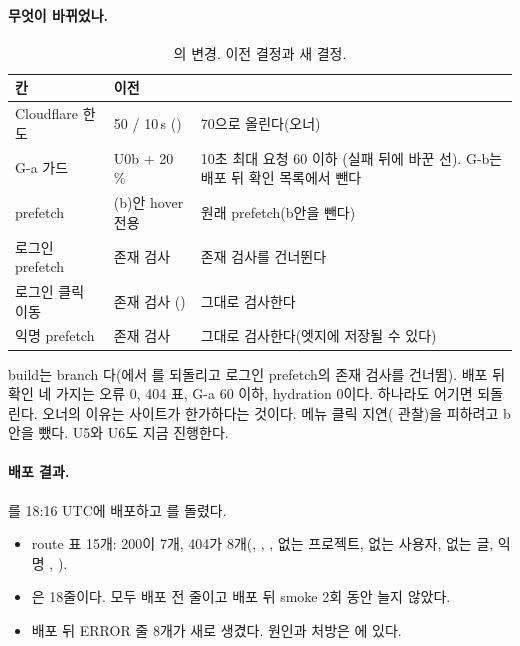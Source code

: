 \paragraph{무엇이 바뀌었나.}
\begin{table}[H]
  \caption{의 변경. 이전 결정과 새 결정.}
  \label{tab:re-u4-o}
  \centering\small
  \begin{tabularx}{\linewidth}{@{}L{3.0cm} L{3.4cm} Y@{}}
    \toprule
    칸 & 이전 &  \\
    \midrule
    Cloudflare 한도 & 50 / 10\,s () & 70으로 올린다(오너) \\
    \midrule
    G-a 가드 & U0b + 20\,\% & 10초 최대 요청 60 이하 (실패 뒤에 바꾼 선). G-b는 배포 뒤 확인 목록에서 뺀다 \\
    \midrule
    prefetch & (b)안 hover 전용 & 원래 prefetch(b안을 뺀다) \\
    \midrule
    로그인 prefetch & 존재 검사 & 존재 검사를 건너뛴다 \\
    \midrule
    로그인 클릭 이동 & 존재 검사 () & 그대로 검사한다 \\
    \midrule
    익명 prefetch & 존재 검사 & 그대로 검사한다(엣지에 저장될 수 있다) \\
    \bottomrule
  \end{tabularx}
\end{table}
build는 branch 다(에서 를 되돌리고 로그인 prefetch의 존재 검사를 건너뜀).
배포 뒤 확인 네 가지는 오류 0, 404 표, G-a 60 이하, hydration 0이다. 하나라도 어기면 되돌린다.
오너의 이유는 사이트가 한가하다는 것이다. 메뉴 클릭 지연( 관찰)을 피하려고 b안을 뺐다.
U5와 U6도 지금 진행한다.

\paragraph{배포 결과.}
를 18:16 UTC에 배포하고 를 돌렸다.
\begin{itemize}[nosep]
  \item route 표 15개: 200이 7개, 404가 8개(, , , 없는 프로젝트, 없는 사용자, 없는 글, 익명 , ).
  \item {}은 18줄이다. 모두 배포 전 줄이고 배포 뒤 smoke 2회 동안 늘지 않았다.
  \item 배포 뒤 ERROR 줄 8개가 새로 생겼다. 원인과 처방은 에 있다.
\end{itemize}


